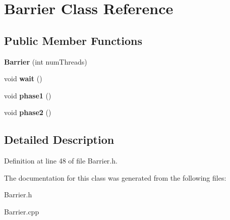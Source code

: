 \hypertarget{class_barrier}{}\section{Barrier Class Reference}
\label{class_barrier}
\subsection*{Public Member Functions}
\begin{DoxyCompactItemize}
\item 
\mbox{\label{class_barrier_a7290fb8952d0f7779b8d6a7a34bbd407}} 
{\bfseries Barrier} (int num\+Threads)
\item 
\mbox{\label{class_barrier_a83a9d2e85e98b3d2081538bf0da29b60}} 
void {\bfseries wait} ()
\item 
\mbox{\label{class_barrier_aef1a70f9dfdaa5f0a10274a46a040f8d}} 
void {\bfseries phase1} ()
\item 
\mbox{\label{class_barrier_ac91842c7f750131e80a037a02feb5486}} 
void {\bfseries phase2} ()
\end{DoxyCompactItemize}


\subsection{Detailed Description}


Definition at line 48 of file Barrier.\+h.



The documentation for this class was generated from the following files\+:\begin{DoxyCompactItemize}
\item 
Barrier.\+h\item 
Barrier.\+cpp\end{DoxyCompactItemize}
